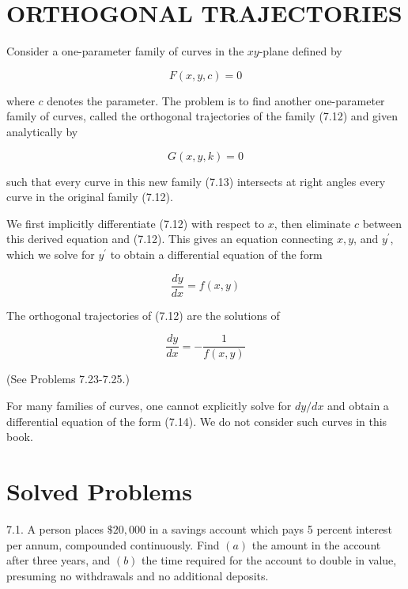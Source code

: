 \documentclass[10pt]{article}
\begin{document}
\section*{ORTHOGONAL TRAJECTORIES}
Consider a one-parameter family of curves in the $x y$-plane defined by


\begin{equation*}
F(x, y, c)=0 \tag{7.12}
\end{equation*}


where $c$ denotes the parameter. The problem is to find another one-parameter family of curves, called the orthogonal trajectories of the family (7.12) and given analytically by


\begin{equation*}
G(x, y, k)=0 \tag{7.13}
\end{equation*}


such that every curve in this new family (7.13) intersects at right angles every curve in the original family (7.12).

We first implicitly differentiate (7.12) with respect to $x$, then eliminate $c$ between this derived equation and (7.12). This gives an equation connecting $x, y$, and $y^{\prime}$, which we solve for $y^{\prime}$ to obtain a differential equation of the form


\begin{equation*}
\frac{d \dot{y}}{d x}=f(x, y) \tag{7.14}
\end{equation*}


The orthogonal trajectories of (7.12) are the solutions of


\begin{equation*}
\frac{d y}{d x}=-\frac{1}{f(x, y)} \tag{7.15}
\end{equation*}


(See Problems 7.23-7.25.)

For many families of curves, one cannot explicitly solve for $d y / d x$ and obtain a differential equation of the form (7.14). We do not consider such curves in this book.

\section*{Solved Problems}
7.1. A person places $\$ 20,000$ in a savings account which pays 5 percent interest per annum, compounded continuously. Find $(a)$ the amount in the account after three years, and $(b)$ the time required for the account to double in value, presuming no withdrawals and no additional deposits.
\end{document}
